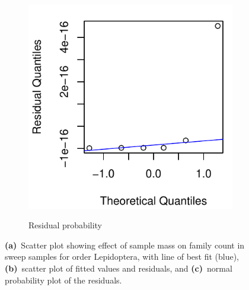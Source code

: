 \documentclass[10pt,letterpaper,twocolumn]{article}
\begin{document}
\begin{figure}[h]
\begin{subfigure}[b]{0.15\textwidth}
		\label{fig:sweep_lepidoptera_resid}
	\end{subfigure}
	~
	\begin{subfigure}[b]{0.15\textwidth}
		\caption{Residual probability}
		\includegraphics[width=\textwidth]{plots/mass-vs-count/qqplot/2015_sweep_Lepidoptera_qqplot.pdf}
		\label{fig:sweep_lepidoptera_qqplot}
	\end{subfigure}
	\caption{\textbf{(a)}~Scatter plot showing effect of sample mass on family count in sweep samples for order Lepidoptera, with line of best fit (blue), \textbf{(b)}~scatter plot of fitted values and residuals, and \textbf{(c)}~normal probability plot of the residuals.}
	\label{fig:sweep_lepidoptera}
	\smallskip
	\nointerlineskip
	\hrulefill
\end{figure}
\end{document}
